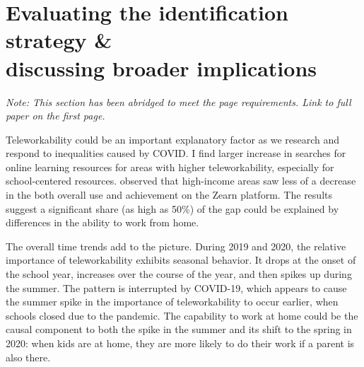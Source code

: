 \section{Evaluating the identification strategy \& \\ discussing broader implications} \label{sec:discussion}
\if{}
{\small
    \textit{Note: This section has been abridged to meet the page requirements. Link to full paper on the first page.}
}
\fi

\if{}
Teleworkability could be an important explanatory factor as we research and respond to inequalities caused by COVID.
I find larger increase in searches for online learning resources for areas with higher teleworkability, especially for school-centered resources.
\cite{chetty} observed that high-income areas saw less of a decrease in the both overall use and achievement on the Zearn platform.
The results suggest a significant share (as high as 50\%) of the gap could be explained by differences in the ability to work from home.


The overall time trends add to the picture. During 2019 and 2020, the relative importance of teleworkability exhibits seasonal behavior. It drops at the onset of the school year, increases over the course of the year, and then spikes up during the summer. The pattern is interrupted by COVID-19, which appears to cause the summer spike in the importance of teleworkability to occur earlier, when schools closed due to the pandemic. The capability to work at home could be the causal component to both the spike in the summer and its shift to the spring in 2020: when kids are at home, they are more likely to do their work if a parent is also there.

